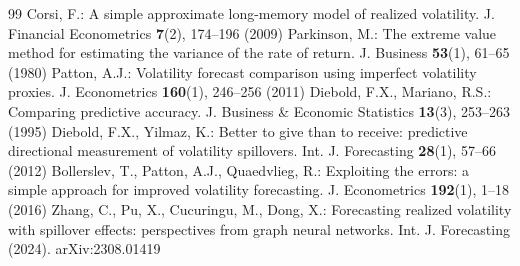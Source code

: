 \documentclass{llncs}
\begin{document}
\begin{thebibliography}{99}
 Corsi, F.: A simple approximate long-memory model of realized volatility. J. Financial Econometrics \textbf{7}(2), 174--196 (2009)
 Parkinson, M.: The extreme value method for estimating the variance of the rate of return. J. Business \textbf{53}(1), 61--65 (1980)
 Patton, A.J.: Volatility forecast comparison using imperfect volatility proxies. J. Econometrics \textbf{160}(1), 246--256 (2011)
 Diebold, F.X., Mariano, R.S.: Comparing predictive accuracy. J. Business \& Economic Statistics \textbf{13}(3), 253--263 (1995)
 Diebold, F.X., Yilmaz, K.: Better to give than to receive: predictive directional measurement of volatility spillovers. Int. J. Forecasting \textbf{28}(1), 57--66 (2012)
 Bollerslev, T., Patton, A.J., Quaedvlieg, R.: Exploiting the errors: a simple approach for improved volatility forecasting. J. Econometrics \textbf{192}(1), 1--18 (2016)
 Zhang, C., Pu, X., Cucuringu, M., Dong, X.: Forecasting realized volatility with spillover effects: perspectives from graph neural networks. Int. J. Forecasting (2024). arXiv:2308.01419
\end{thebibliography}
\end{document}
